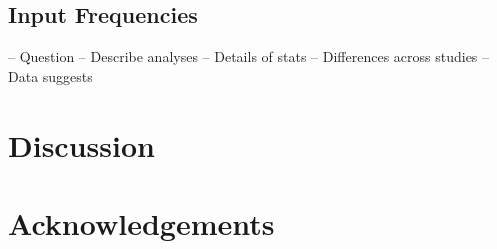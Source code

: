\documentclass[10pt,letterpaper]{article}
\begin{document}
\subsection{Input Frequencies}
-- Question
-- Describe analyses
-- Details of stats
-- Differences across studies
-- Data suggests

\section{Discussion}

\section{Acknowledgements}




\setlength{\bibleftmargin}{.125in}
\setlength{\bibindent}{--\bibleftmargin}


\end{document}
